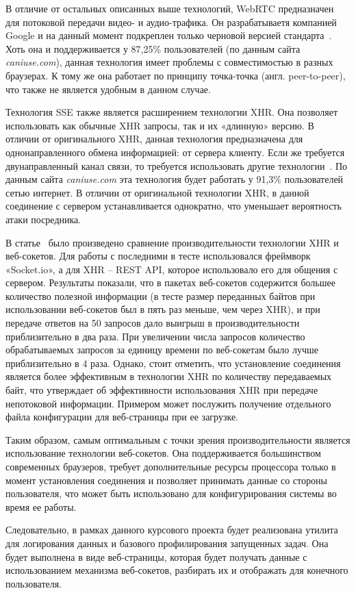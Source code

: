 В отличие от остальных описанных выше технологий, WebRTC предназначен для потоковой
передачи видео- и аудио-трафика. Он разрабатываетя компанией Google и на данный момент
подкреплен только черновой версией стандарта~\cite{w3c_webrtc_site}. Хоть она и
поддерживается у 87,25\% пользователей (по данным сайта \textit{caniuse.com}),
данная технология имеет проблемы с совместимостью в разных браузерах.
К тому же она работает по принципу точка-точка (англ. peer-to-peer), что также
не является удобным в данном случае.

Технология SSE также является расширением технологии XHR. Она позволяет использовать
как обычные XHR запросы, так и их «длинную» версию. В отличии от оригинального XHR,
данная технология предназначена для однонаправленного обмена информацией: от сервера
клиенту. Если же требуется двунаправленный канал связи, то требуется использовать
другие технологии~\cite{professional_js_book}. По данным сайта \textit{caniuse.com}
эта технология будет работать у 91,3\% пользователей сетью интернет.
В отличии от оригинальной технологии XHR, в данной соединение с сервером
устанавливается однократно, что уменьшает вероятность атаки посредника.

В статье~\cite{websock_xhr_benchmark_site} было произведено сравнение
производительности технологии XHR и веб-сокетов. Для работы с последними в тесте
использовался фреймворк «Socket.io», а для XHR -- REST API, которое использовало его
для общения с сервером. Результаты показали, что в пакетах веб-сокетов содержится
большее количество полезной информации (в тесте размер переданных байтов
при использовании веб-сокетов был в пять раз меньше, чем через XHR), и при передаче
ответов на 50 запросов дало выигрыш в производительности приблизительно в два раза.
При увеличении числа запросов количество обрабатываемых запросов за единицу времени
по веб-сокетам было лучше приблизительно в 4 раза. Однако, стоит отметить,
что установление соединения является более эффективным в технологии XHR по количеству
передаваемых байт, что утверждает об эффективности использования XHR при передаче
непотоковой информации. Примером может послужить получение отдельного
файла конфигурации для веб-страницы при ее загрузке.

Таким образом, самым оптимальным с точки зрения производительности является
использование технологии веб-сокетов. Она поддерживается большинством современных
браузеров, требует дополнительные ресурсы процессора только в момент установления
соединения и позволяет принимать данные со стороны пользователя, что может быть
использовано для конфигурирования системы во время ее работы.

Следовательно, в рамках данного курсового проекта будет реализована утилита
для логирования данных и базового профилирования запущенных задач.
Она будет выполнена в виде веб-страницы, которая будет получать данные с
использованием механизма веб-сокетов, разбирать их и отображать для
конечного пользователя.
